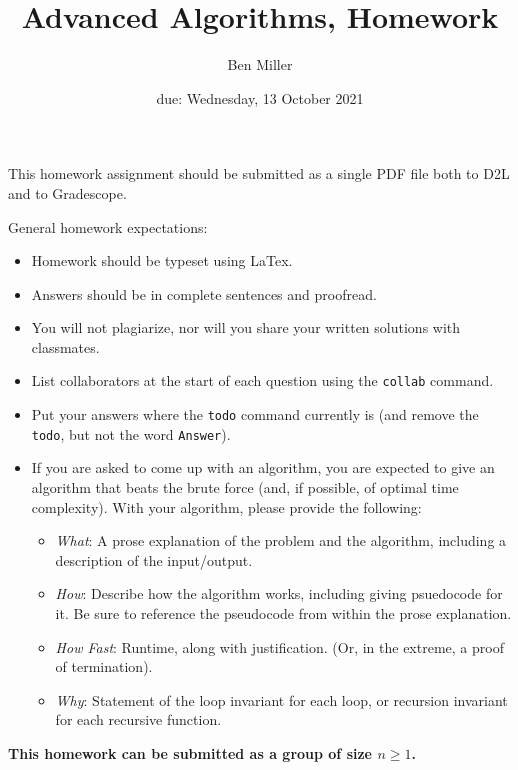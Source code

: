 \documentclass{article}
\title{Advanced Algorithms, Homework \hwnum}
\author{Ben Miller}
\date{due: Wednesday, 13 October 2021}
\begin{document}
\maketitle

This homework assignment should be
submitted as a single PDF file both to D2L and to Gradescope.

General homework expectations:
\begin{itemize}
    \item Homework should be typeset using LaTex.
    \item Answers should be in complete sentences and proofread.
    \item You will not plagiarize, nor will you share your written solutions
        with classmates.
    \item List collaborators at the start of each question using the
        \texttt{collab} command.
    \item Put your answers where the \texttt{todo} command currently is (and
        remove the \texttt{todo}, but not the word \texttt{Answer}).
    \item If you are asked to come up with an algorithm, you are
        expected to give an algorithm that beats the brute force (and, if possible, of
        optimal time complexity). With your algorithm, please provide the following:
        \begin{itemize}
            \item \emph{What}: A prose explanation of the problem and the algorithm,
                including a description of the input/output.
            \item \emph{How}: Describe how the algorithm works, including giving
                psuedocode for it.  Be sure to reference the pseudocode
                from within the prose explanation.
            \item \emph{How Fast}: Runtime, along with justification.  (Or, in the
                extreme, a proof of termination).
            \item \emph{Why}: Statement of the loop invariant for each loop, or
                recursion invariant for each recursive function.
        \end{itemize}
\end{itemize}

{\bf
This homework can be submitted as a group of size $n \geq 1$.
}

\collab{}
\end{document}
